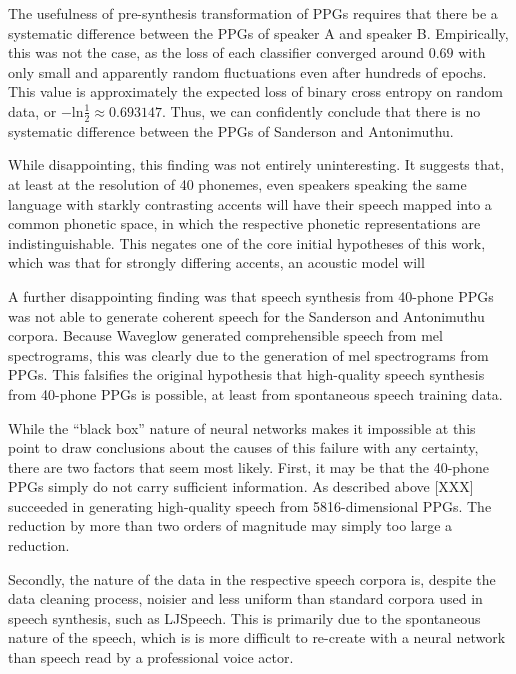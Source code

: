 The usefulness of pre-synthesis transformation of PPGs requires that there be a systematic difference between
the PPGs of speaker A and speaker B. Empirically, this was not the case, as the loss of each classifier 
converged around $0.69$ with only small and apparently random fluctuations even after hundreds of epochs. 
This value is approximately the expected loss of binary cross entropy on random data,
or $-\textrm{ln} \frac{1}{2} \approx 0.693147$. Thus, we can confidently conclude that there is no systematic 
difference between the PPGs of Sanderson and Antonimuthu.

While disappointing, this finding was not entirely uninteresting. It suggests that, at least at the 
resolution of 40 phonemes, even speakers speaking the same language with starkly contrasting accents 
will have their speech mapped into a common phonetic space, in which the respective phonetic representations 
are indistinguishable. This negates one of the core initial hypotheses of this work, which was that 
for strongly differing accents, an acoustic model will 

A further disappointing finding was that speech synthesis from 40-phone PPGs was not able to generate coherent 
speech for the Sanderson and Antonimuthu corpora. Because Waveglow generated comprehensible speech from mel spectrograms, 
this was clearly due to the generation of mel spectrograms from PPGs. This falsifies the original hypothesis that 
high-quality speech synthesis from 40-phone PPGs is possible, at least from spontaneous speech training data. 

While the ``black box'' nature of neural networks makes it impossible at this point to draw conclusions about 
the causes of this failure with any certainty, there are two factors that seem most likely. First, it may be 
that the 40-phone PPGs simply do not carry sufficient information. As described above [XXX] succeeded in 
generating high-quality speech from 5816-dimensional PPGs. The reduction by more than two orders of magnitude may 
simply too large a reduction.

Secondly, the nature of the data in the respective speech corpora is, despite the data cleaning process, 
noisier and less uniform than standard corpora used in speech synthesis, such as LJSpeech. This is primarily 
due to the spontaneous nature of the speech, which is is more difficult to re-create with a neural network 
than speech read by a professional voice actor.